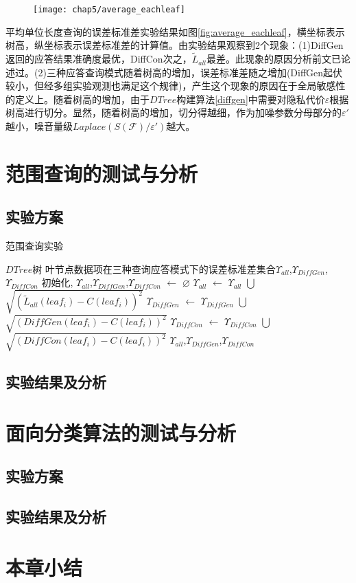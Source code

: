 \begin{figure}[!htp]
	\centering
	\texttt{[image: chap5/average\_eachleaf]}
\end{figure}

平均单位长度查询的误差标准差实验结果如图\ref{fig:average_eachleaf}，横坐标表示树高，纵坐标表示误差标准差的计算值。由实验结果观察到2个现象：(1)DiffGen返回的应答结果准确度最优，DiffCon次之，$\tilde{L}_{all}$最差。此现象的原因分析前文已论述过。(2)三种应答查询模式随着树高的增加，误差标准差随之增加(DiffGen起伏较小，但经多组实验观测也满足这个规律)，产生这个现象的原因在于全局敏感性的定义上。随着树高的增加，由于$DTree$构建算法\ref{diffgen}中需要对隐私代价$\varepsilon$根据树高进行切分。显然，随着树高的增加，切分得越细，作为加噪参数分母部分的${\varepsilon}'$越小，噪音量级$Laplace(S(\mathcal{F})/{\varepsilon}')$越大。



\section{范围查询的测试与分析}
\subsection{实验方案}

\begin{algorithm}[H]
	\caption{范围查询实验}
	\begin{algorithmic}[1]
		\REQUIRE $DTree$树
		\ENSURE 叶节点数据项在三种查询应答模式下的误差标准差集合$\Upsilon_{all}$,$\Upsilon_{DiffGen}$,$\Upsilon_{DiffCon}$
		初始化, $\Upsilon_{all}$,$\Upsilon_{DiffGen}$,$\Upsilon_{DiffCon}$ $\leftarrow$ $\varnothing$
		\STATE $\Upsilon_{all}$ $\leftarrow$ $\Upsilon_{all}$ $\bigcup$ $\sqrt {(\tilde{L}_{all}(leaf_{i})-C(leaf_{i}))^2}$
		\STATE $\Upsilon_{DiffGen}$ $\leftarrow$ $\Upsilon_{DiffGen}$ $\bigcup$ $\sqrt {(DiffGen(leaf_{i})-C(leaf_{i}))^2}$
		\STATE $\Upsilon_{DiffCon}$ $\leftarrow$ $\Upsilon_{DiffCon}$ $\bigcup$ $\sqrt {(DiffCon(leaf_{i})-C(leaf_{i}))^2}$
		\ENDFOR
		\RETURN $\Upsilon_{all}$,$\Upsilon_{DiffGen}$,$\Upsilon_{DiffCon}$
	\end{algorithmic}
\end{algorithm}


\subsection{实验结果及分析}

\section{面向分类算法的测试与分析}

\subsection{实验方案}

\subsection{实验结果及分析}    

\section{本章小结}

